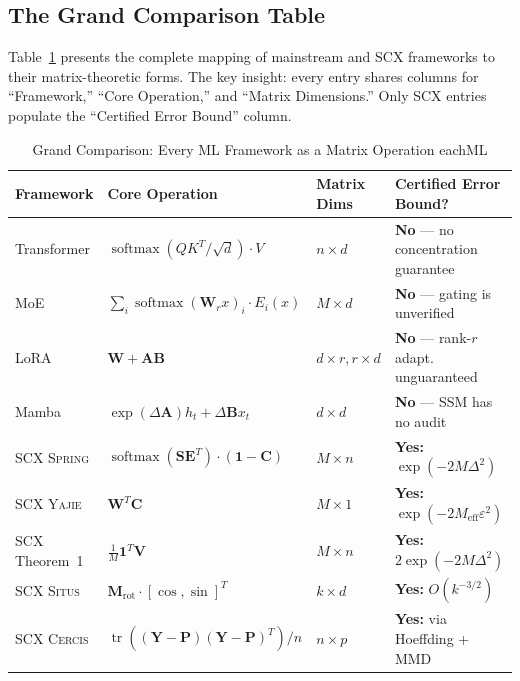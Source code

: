 \documentclass[12pt,a4paper]{article}
\theoremstyle{definition}
\newcommand{\Situs}{\textsc{Situs}}
\newcommand{\Yajie}{\textsc{Yajie}}
\newcommand{\Spring}{\textsc{Spring}}
\newcommand{\Cercis}{\textsc{Cercis}}
\newcommand{\SCX}{\textsc{SCX}}
\DeclareMathOperator{\tr}{tr}
\DeclareMathOperator{\softmax}{softmax}
\newcommand{\ones}{\mathbf{1}}
\newcommand{\mat}[1]{\mathbf{#1}}
\begin{document}
\subsection{The Grand Comparison Table }

Table~\ref{tab:grand_comparison} presents the complete mapping of mainstream and \SCX{} 
frameworks to their matrix-theoretic forms. The key insight: every entry shares columns
for ``Framework,'' ``Core Operation,'' and ``Matrix Dimensions.'' Only \SCX{} entries 
populate the ``Certified Error Bound'' column.

\begin{table}[htbp]
\centering
\caption{Grand Comparison: Every ML Framework as a Matrix Operation eachML}
\label{tab:grand_comparison}
\begin{tabular}{@{}p{2.2cm}p{4.2cm}p{2.2cm}p{4.5cm}@{}}
\toprule
\textbf{Framework} & \textbf{Core Operation} & \textbf{Matrix Dims} & \textbf{Certified Error Bound?} \\
\midrule
Transformer & $\softmax(QK^T/\sqrt{d}) \cdot V$ & $n \times d$ & \textbf{No} — no concentration guarantee \\
MoE & $\sum_i \softmax(\mat{W}_r x)_i \cdot E_i(x)$ & $M \times d$ & \textbf{No} — gating is unverified \\
LoRA & $\mat{W} + \mat{A}\mat{B}$ & $d \times r, r \times d$ & \textbf{No} — rank-$r$ adapt. unguaranteed \\
Mamba & $\exp(\Delta\mat{A})h_t + \Delta\mat{B}x_t$ & $d \times d$ & \textbf{No} — SSM has no audit \\
\midrule
\rowcolor{green!8}
\SCX{} \Spring{} & $\softmax(\mat{S}\mat{E}^T) \cdot (\ones-\mat{C})$ & $M \times n$ & \textbf{Yes:} $\exp(-2M\Delta^2)$ \\
\rowcolor{green!8}
\SCX{} \Yajie{} & $\mat{W}^T \mat{C}$ & $M \times 1$ & \textbf{Yes:} $\exp(-2M_{\text{eff}}\varepsilon^2)$ \\
\rowcolor{green!8}
\SCX{} Theorem~1 & $\frac{1}{M}\ones^T \mat{V}$ & $M \times n$ & \textbf{Yes:} $2\exp(-2M\Delta^2)$ \\
\rowcolor{green!8}
\SCX{} \Situs{} & $\mat{M}_{\text{rot}} \cdot [\cos, \sin]^T$ & $k \times d$ & \textbf{Yes:} $O(k^{-3/2})$ \\
\rowcolor{green!8}
\SCX{} \Cercis{} & $\tr((\mat{Y}-\mat{P})(\mat{Y}-\mat{P})^T)/n$ & $n \times p$ & \textbf{Yes:} via Hoeffding + MMD \\
\bottomrule
\end{tabular}
\end{table}
\end{document}
